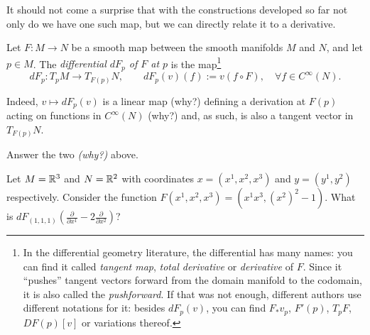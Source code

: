 It should not come a surprise that with the constructions developed so far not only do we have one such map, but we can directly relate it to a derivative.

\begin{definition}\label{def:differentialMap}
	Let $F: M \to N$ be a smooth map between the smooth manifolds $M$ and $N$, and let $p\in M$.
	The \emph{differential $d F_p$ of $F$ at $p$} is the map\footnote{In the differential geometry literature, the differential has many names: you can find it called \emph{tangent map}, \emph{total derivative} or \emph{derivative} of $F$.
		Since it ``pushes'' tangent vectors forward from the domain manifold to the codomain, it is also called the \emph{pushforward}. If that was not enough, different authors use different notations for it: besides $dF_p(v)$, you can find $F_* v_p$, $F'(p)$, $T_pF$, $DF(p)[v]$ or variations thereof.}
	\begin{equation}
		d F_p : T_p M \to T_{F(p)} N, \qquad d F_p (v) (f) := v(f\circ F), \quad \forall f\in C^\infty(N).
	\end{equation}
\end{definition}

Indeed, $v \mapsto d F_p (v)$ is a linear map (why?) defining a derivation at $F(p)$ acting on functions in $C^\infty(N)$ (why?) and, as such, is also a tangent vector in $T_{F(p)}N$.

\begin{exercise}
	Answer the two \emph{(why?)} above.
\end{exercise}
\begin{exercise}
	Let $M = \mathbb{R}^3$ and $N = \mathbb{R}^2$ with coordinates $x=(x^1,x^2,x^3)$ and $y=(y^1,y^2)$ respectively.
	Consider the function $F(x^1,x^2,x^3) = (x^1 x^3, (x^2)^2-1)$.
	What is $d F_{(1,1,1)} \left(\frac{\partial}{\partial x^1} - 2 \frac{\partial}{\partial x^2}\right)$?
\end{exercise}

